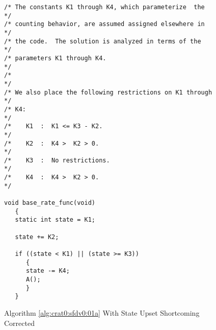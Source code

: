 \begin{figure}
\begin{verbatim}
/* The constants K1 through K4, which parameterize  the   */
/* counting behavior, are assumed assigned elsewhere in   */
/* the code.  The solution is analyzed in terms of the    */
/* parameters K1 through K4.                              */
/*                                                        */
/* We also place the following restrictions on K1 through */
/* K4:                                                    */
/*    K1  :  K1 <= K3 - K2.                               */
/*    K2  :  K4 >  K2 > 0.                                */
/*    K3  :  No restrictions.                             */
/*    K4  :  K4 >  K2 > 0.                                */

void base_rate_func(void)
   {
   static int state = K1;

   state += K2;

   if ((state < K1) || (state >= K3))
      {
      state -= K4;
      A();
      }
   }
\end{verbatim}
\caption{Algorithm \ref{alg:crat0:sfdv0:01a} With State Upset Shortcoming
         Corrected}
\label{fig:crat0:sfdv0:sprc0:01}
\end{figure}

